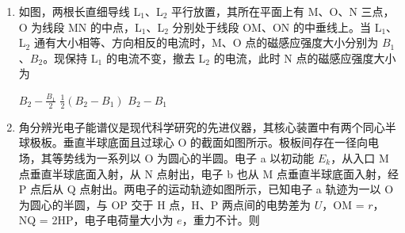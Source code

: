 \documentclass[\gkver]{gaokaozhenti}
\begin{document}
\begin{enumerate}
{B．根据图 b 可知，输入电压最大值 $U_{m} = 48\sqrt{2} \UV$，则输入电压有效值为 $U_{1} = \frac{U_{m}}{\sqrt{2}} = 48 \UV$，根据变压比可知，副线圈电压即电压表示数为 $U_{2} = \frac{n_{2}}{n_{1}}U_{1} = 12 \UV$，故 B 正确；

C．$R_{1}$ 的阻值为 $R_{2}$ 的 2 倍，根据并联规律可知，两电阻的电压相同，根据欧姆定律可知，流经 $R_{1}$ 和 $R_{2}$ 的电流之比为 $1:2$，副线圈干路电流等于流经两电阻的电流之和，则副线圈干路的电流为 $R_{1}$ 电流的 3 倍，故 C 错误；

D．根据变压器的原理可知，原副线圈功率相同，故 D 错误。

故选 B。
}

\item
如图，两根长直细导线 L$_{1}$、L$_{2}$ 平行放置，其所在平面上有 M、O、N 三点，O 为线段 MN 的中点，L$_{1}$、L$_{2}$ 分别处于线段 OM、ON 的中垂线上。当 L$_{1}$、L$_{2}$ 通有大小相等、方向相反的电流时，M、O 点的磁感应强度大小分别为 $B_{1}$、$B_{2}$。现保持 L$_{1}$ 的电流不变，撤去 L$_{2}$ 的电流，此时 N 点的磁感应强度大小为

\onepicture[w=4.85cm]{}

{$B_{2} - \frac{B_{1}}{2}$}
{$\frac{1}{2}(B_{2} - B_{1})$}
{$B_{2} - B_{1}$}


\item
角分辨光电子能谱仪是现代科学研究的先进仪器，其核心装置中有两个同心半球极板。垂直半球底面且过球心 O 的截面如图所示。极板间存在一径向电场，其等势线为一系列以 O 为圆心的半圆。电子 a 以初动能 $E_{k}$，从入口 M 点垂直半球底面入射，从 N 点射出，电子 b 也从 M 点垂直半球底面入射，经 P 点后从 Q 点射出。两电子的运动轨迹如图所示，已知电子 a 轨迹为一以 O 为圆心的半圆，与 OP 交于 H 点，H、P 两点间的电势差为 $U$，OM = $r$，NQ = 2HP，电子电荷量大小为 $e$，重力不计。则


\end{enumerate}
\end{document}
